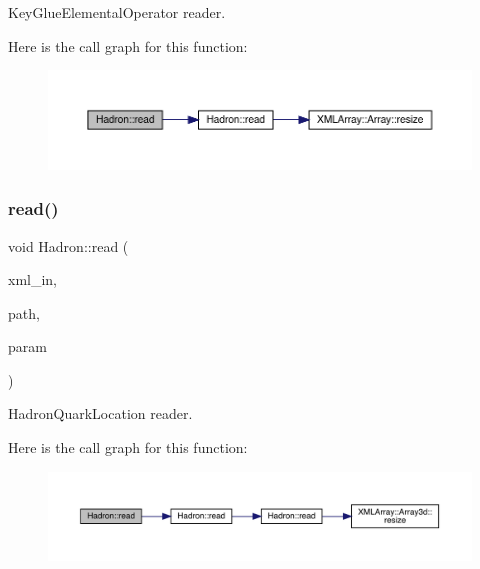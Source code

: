 Key\+Glue\+Elemental\+Operator reader. 

Here is the call graph for this function\+:
\nopagebreak
\begin{figure}[H]
\begin{center}
\leavevmode
\includegraphics[width=350pt]{d1/daf/namespaceHadron_a008c27a4777be30324acc6271e059d2e_cgraph}
\end{center}
\end{figure}
\mbox{\label{namespaceHadron_a48b9ff1049a4c339c032065b538ed41f}} 
\subsubsection{\texorpdfstring{read()}{read()}\hspace{0.1cm}{\footnotesize\ttfamily [50/94]}}
{\footnotesize\ttfamily void Hadron\+::read (\begin{DoxyParamCaption}\item[{\mbox{\hyperlink{classADATXML_1_1XMLReader}{X\+M\+L\+Reader}} \&}]{xml\+\_\+in,  }\item[{const std\+::string \&}]{path,  }\item[{\mbox{\hyperlink{structHadron_1_1HadronQuarkLocation__t}{Hadron\+Quark\+Location\+\_\+t}} \&}]{param }\end{DoxyParamCaption})}



Hadron\+Quark\+Location reader. 

Here is the call graph for this function\+:
\nopagebreak
\begin{figure}[H]
\begin{center}
\leavevmode
\includegraphics[width=350pt]{d1/daf/namespaceHadron_a48b9ff1049a4c339c032065b538ed41f_cgraph}
\end{center}
\end{figure}
\mbox{\label{namespaceHadron_a22ce4d5ec6f9bf7a3504cb4b7b176c78}} 
